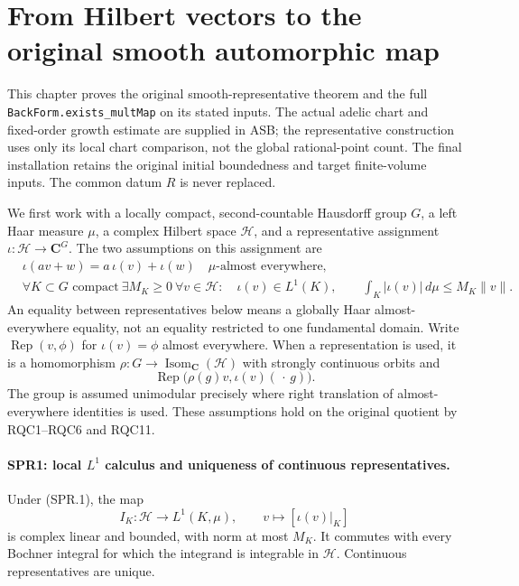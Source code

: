 \section{From Hilbert vectors to the original smooth automorphic map}
\label{sec:smooth-representatives}

This chapter proves the original smooth-representative theorem and the
full \texttt{BackForm.\allowbreak exists\_\allowbreak multMap} on its stated inputs.  The
actual adelic chart and fixed-order growth estimate are supplied in
ASB; the representative construction uses only its local chart
comparison, not the global rational-point count.
The final installation retains the original initial boundedness and
target finite-volume inputs.  The common datum \(R\) is never replaced.

We first work with a locally compact, second-countable Hausdorff group
\(G\), a left Haar measure \(\mu\), a complex Hilbert space
\(\mathcal H\), and a representative assignment
\(\iota:\mathcal H\to\mathbf C^G\).
The two assumptions on this assignment are
\[
\begin{split}
 &\iota(av+w)=a\,\iota(v)+\iota(w)\quad\mu\text{-almost everywhere},\\
 &\forall K\subset G\text{ compact}\ \exists M_K\ge0\
   \forall v\in\mathcal H:\quad
   \iota(v)\in L^1(K),\qquad
   \int_K|\iota(v)|\,d\mu\le M_K\|v\|.
\end{split}
\tag{SPR.1}
\]
An equality between representatives below means a globally Haar
almost-everywhere equality, not an equality restricted to one
fundamental domain.  Write
\(\operatorname{Rep}(v,\phi)\) for
\(\iota(v)=\phi\) almost everywhere.
When a representation is used, it is a homomorphism
\(\rho:G\to\operatorname{Isom}_{\mathbf C}(\mathcal H)\) with
strongly continuous orbits and
\[
 \operatorname{Rep}\bigl(\rho(g)v,\iota(v)(\,\cdot\,g)\bigr).
 \tag{SPR.2}
\]
The group is assumed unimodular precisely where right translation of
almost-everywhere identities is used.  These assumptions hold on the
original quotient by RQC1--RQC6 and RQC11.

\paragraph{SPR1: local \(L^1\) calculus and uniqueness of continuous representatives.}
\label{claim:SPR1}
Under (SPR.1), the map
\[
 I_K:\mathcal H\longrightarrow L^1(K,\mu),\qquad
               v\longmapsto[\iota(v)|_K]
 \tag{SPR.3}
\]
is complex linear and bounded, with norm at most \(M_K\).
It commutes with every Bochner integral for which the integrand is
integrable in \(\mathcal H\).  Continuous representatives are unique.

